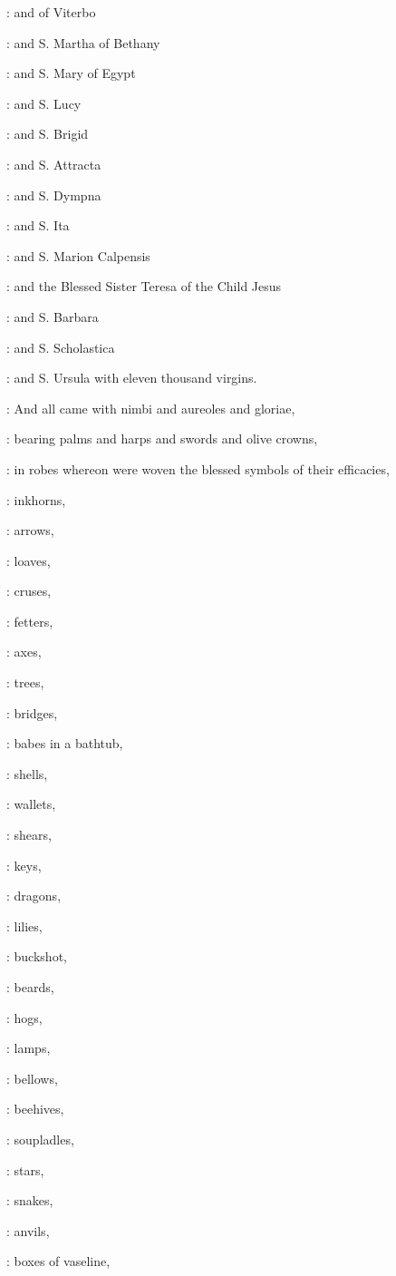 :
and of Viterbo 

:
and S. Martha of Bethany 

:
and S. Mary of Egypt 

:
and S. Lucy 

:
and S. Brigid 

:
and S. Attracta 

:
and S. Dympna 

:
and S. Ita 

:
and S. Marion Calpensis 

:
and the Blessed Sister Teresa of the Child Jesus 

:
and S. Barbara 

:
and S. Scholastica 

:
and S. Ursula with eleven thousand virgins.

:
And all came with nimbi and aureoles and gloriae,

:
bearing palms and harps and swords and olive crowns,

:
in robes whereon were woven the blessed symbols of their efficacies,

:
inkhorns,

:
arrows,

:
loaves,

:
cruses,

:
fetters,

:
axes,

:
trees,

:
bridges,

:
babes in a bathtub,

:
shells,

:
wallets,

:
shears,

:
keys,

:
dragons,

:
lilies,

:
buckshot,

:
beards,

:
hogs,

:
lamps,

:
bellows,

:
beehives,

:
soupladles,

:
stars,

:
snakes,

:
anvils,

:
boxes of vaseline,

